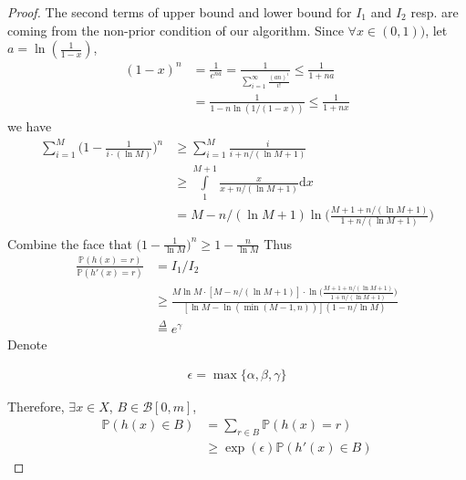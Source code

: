 \documentclass[12pt]{article}
\numberwithin{theorem}{section} %
\numberwithin{definition}{section} %
\numberwithin{assumption}{section} %
\numberwithin{lemma}{section} %
\numberwithin{remark}{section} %
\numberwithin{prop}{section} %
\numberwithin{corollary}{section} %
\numberwithin{example}{section} %
\numberwithin{question}{section} %
\numberwithin{problem}{section} %
\numberwithin{conjecture}{section} %
\numberwithin{append}{section} %
\numberwithin{property}{section} %
\def\P{{\mathbb P}}     %
\def\d{\mathrm{d}}   %
\begin{document}
\begin{proof}
The second terms of upper bound and lower bound for $I_1$ and $I_2$ resp. are coming from the non-prior condition of our algorithm. Since $\forall x\in(0,1))$, let $a=\ln(\frac{1}{1-x})$,
\begin{equation}
	\begin{aligned}
		(1-x)^n&=\frac{1}{e^{na}}=\frac{1}{\sum\limits_{i=1}^\infty \frac{(an)^i}{i!}}\le \frac{1}{1+na}\\
		&=\frac{1}{1-n\ln(1/(1-x))}\le \frac{1}{1+nx}
	\end{aligned}
\end{equation}
we have 
\begin{equation}
	\begin{aligned}
		\sum\limits_{i=1}^M \bigg(1-\frac{1}{i\cdot (\ln M )}	 \bigg)^n & \ge 	\sum\limits_{i=1}^M \frac{i}{i+n/(\ln M +1)}\\
		&\ge \int\limits_{1}^{M+1} \frac{x}{x+n/(\ln M +1)} \d x\\
		&= M - n/(\ln M +1) \ln\bigg(\frac{M+1+n/(\ln M +1)}{1+ n/(\ln M +1)}\bigg)\\
	\end{aligned}
\end{equation}
Combine the face that $\bigg(1-\frac{1}{\ln M }	 \bigg)^n\ge 1-\frac{n}{\ln M }$
Thus
\begin{equation}
	\begin{aligned}
		\frac{\P(h(x)=r)}{\P(h'(x)=r)} & = I_1/I_2\\
		& \ge\frac{M\ln M\cdot[M - n/(\ln M +1)]\cdot \ln\bigg(\frac{M+1+n/(\ln M +1)}{1+ n/(\ln M +1)}\bigg)}{[\ln M -\ln (\min(M-1,n))] (1-n/\ln M)} \\
		& \overset{\Delta}{=} e^\gamma
	\end{aligned}
\end{equation}
Denote 

\begin{equation}
	\begin{aligned}
		\epsilon =\max\{ \alpha, \beta,\gamma\}
	\end{aligned}
\end{equation}

Therefore, $\exists x\in X$, $B\in\mathcal{B}[0,m]$, 
\begin{equation}
	\begin{aligned}
		\P(h(x)\in B)&=\sum\limits_{r\in B} \P(h(x)=r)\\
		 &\ge \exp(\epsilon) \P(h'(x)\in B)
	\end{aligned}
\end{equation}
	

\end{proof}	
	
	
\end{document}
